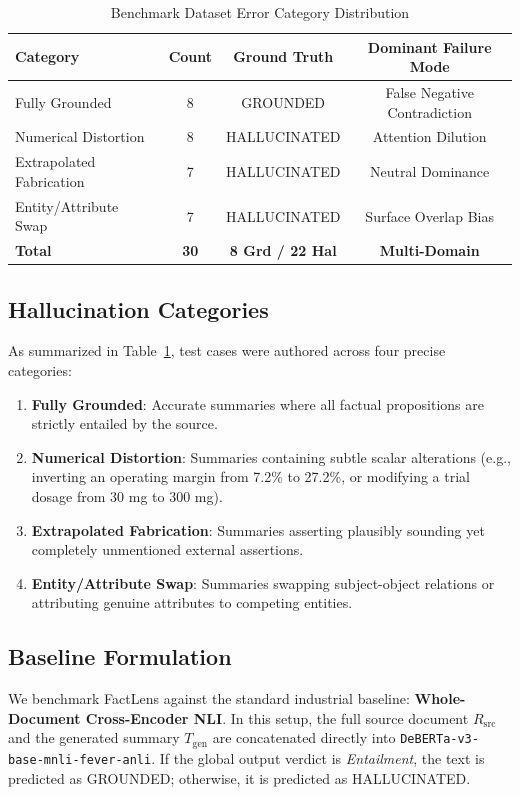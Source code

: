 \documentclass[conference]{IEEEtran}
\begin{document}
\begin{table}[b]
\caption{Benchmark Dataset Error Category Distribution}
\label{tab:dataset_dist}
\centering
\begin{tabular}{lccc}
\toprule
\textbf{Category} & \textbf{Count} & \textbf{Ground Truth} & \textbf{Dominant Failure Mode} \\
\midrule
Fully Grounded & 8 & GROUNDED & False Negative Contradiction \\
Numerical Distortion & 8 & HALLUCINATED & Attention Dilution \\
Extrapolated Fabrication & 7 & HALLUCINATED & Neutral Dominance \\
Entity/Attribute Swap & 7 & HALLUCINATED & Surface Overlap Bias \\
\midrule
\textbf{Total} & \textbf{30} & \textbf{8 Grd / 22 Hal} & \textbf{Multi-Domain} \\
\bottomrule
\end{tabular}
\end{table}

\subsection{Hallucination Categories}
As summarized in Table~\ref{tab:dataset_dist}, test cases were authored across four precise categories:
\begin{enumerate}
    \item \textbf{Fully Grounded}: Accurate summaries where all factual propositions are strictly entailed by the source.
    \item \textbf{Numerical Distortion}: Summaries containing subtle scalar alterations (e.g., inverting an operating margin from 7.2\% to 27.2\%, or modifying a trial dosage from 30 mg to 300 mg).
    \item \textbf{Extrapolated Fabrication}: Summaries asserting plausibly sounding yet completely unmentioned external assertions.
    \item \textbf{Entity/Attribute Swap}: Summaries swapping subject-object relations or attributing genuine attributes to competing entities.
\end{enumerate}

\subsection{Baseline Formulation}
We benchmark FactLens against the standard industrial baseline: \textbf{Whole-Document Cross-Encoder NLI}. In this setup, the full source document $R_{\text{src}}$ and the generated summary $T_{\text{gen}}$ are concatenated directly into \texttt{DeBERTa-v3-base-mnli-fever-anli}. If the global output verdict is \textit{Entailment}, the text is predicted as GROUNDED; otherwise, it is predicted as HALLUCINATED.
\end{document}
